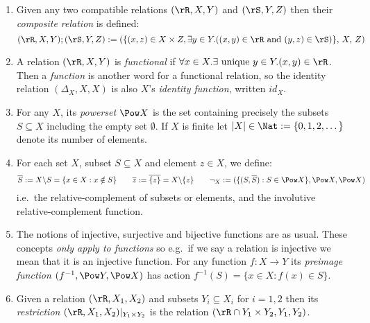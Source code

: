 \documentclass{article}
\begin{document}
\begin{definition}
\begin{enumerate}
\item
Given any two compatible relations $(\rR,X,Y)$ and $(\rS,Y,Z)$ then their \emph{composite relation} is defined:
\[
(\rR,X,Y) ; (\rS,Y,Z) := (\{(x,z) \in X \times Z, \exists y \in Y.( (x,y) \in \rR \text{ and } (y,z) \in \rS ) \},\,X,\,Z)
\]

\item
A relation $(\rR,X,Y)$ is \emph{functional} if $\forall x \in X. \exists \text{ unique } y \in Y. (x,y) \in \rR$.
Then a \emph{function} is another word for a functional relation, so the identity relation $(\Delta_X,X,X)$ is also $X$'s \emph{identity function}, written $id_X$.

\item
For any $X$, its \emph{powerset} $\Pow X$ is the set containing precisely the subsets $S \subseteq X$ including the empty set $\emptyset$. If $X$ is finite let $|X| \in \Nat := \{0,1,2,\dots\}$ denote its number of elements.

\item
For each set $X$, subset $S \subseteq X$ and element $z \in X$, we define:
\[
\overline{S} := X\backslash S = \{ x \in X : x \notin S\}
\qquad
\overline{z} := \overline{\{z\}} = X \backslash \{z\}
\qquad
\neg_X := (\{ (S,\overline{S}) : S \in \Pow X\},\Pow X,\Pow X)
\]
i.e.\ the relative-complement of subsets or elements, and the involutive relative-complement function.



\item
The notions of injective, surjective and bijective functions are as usual. These concepts \emph{only apply to functions} so e.g.\ if we say a relation is injective we mean that it is an injective function. For any function $f : X \to Y$  its \emph{preimage function} $(f^{-1},\Pow Y,\Pow X)$ has action $f^{-1}(S) = \{ x \in X : f(x) \in S \}$.


\item
Given a relation $(\rR,X_1,X_2)$ and subsets $Y_i \subseteq X_i$ for $i = 1,2$ then its \emph{restriction} $(\rR,X_1,X_2) |_{Y_1 \times Y_2}$ is the relation $(\rR \cap Y_1 \times Y_2, Y_1,Y_2)$.


\endbox

\end{enumerate}
\end{definition}
\end{document}
